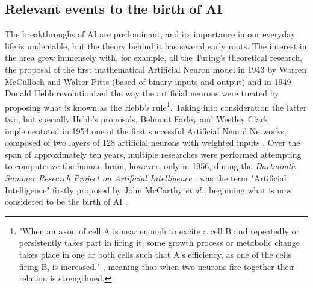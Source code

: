\documentclass[12pt]{article}
\begin{document}
\subsection{Relevant events to the birth of AI}
\par The breakthroughs of AI are predominant, and its importance in our everyday life is undeniable, but the theory behind it has several early roots. The interest in the area grew immensely with, for example, all the Turing's theoretical research, the proposal of the first mathematical Artificial Neuron model in 1943 by Warren McCulloch and Walter Pitts (based of binary inputs and output) \autocite{mccullochLOGICALCALCULUSIDEAS} and in 1949 Donald Hebb revolutionized the way the artificial neurons were treated by proposing what is known as the Hebb's rule\footnote{"When an axon of cell A is near enough to excite a cell B and repeatedly or persistently takes part in firing it, some growth process or metabolic change takes place in one or both cells such that A’s efficiency, as one of the cells firing B, is increased." \autocite{hebbOrganizationBehaviorNeuropsychological1949}, meaning that when two neurons fire together their relation is strengthned.}. Taking into consideration the latter two, but specially Hebb's proposals, Belmont Farley and Westley Clark implementated in 1954 one of the first successful Artificial Neural Networks, composed of two layers of 128 artificial neurons with weighted inputs \autocite{farleySimulationSelforganizingSystems1954}. Over the span of approximately ten years, multiple researches were performed attempting to computerize the human brain, however, only in 1956, during the \textit{Dartmouth Summer Research Project on Artificial Intelligence} \autocite{mccarthyPROPOSALDARTMOUTHSUMMER}, was the term "Artificial Intelligence" firstly proposed by John McCarthy \textit{et al.}, beginning what is now considered to be the birth of AI \autocite{zhangStudyArtificialIntelligence2021}.  
\end{document}
